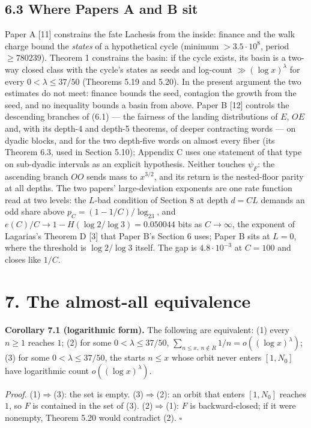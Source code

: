 \documentclass[11pt,a4paper]{article}
\begin{document}
\subsection{6.3 Where Papers A and B
sit}\label{where-papers-a-and-b-sit}

Paper A {[}11{]} constrains the fate Lachesis from the inside: finance
and the walk charge bound the \emph{states} of a hypothetical cycle
(minimum \(>3.5\cdot 10^8\), period \(\ge 780239\)). Theorem 1
constrains the basin: if the cycle exists, its basin is a two-way closed
class with the cycle's states as seeds and log-count
\(\gg(\log x)^\lambda\) for every \(0<\lambda\le37/50\) (Theorems 5.19
and 5.20). In the present argument the two estimates do not meet:
finance bounds the seed, contagion the growth from the seed, and no
inequality bounds a basin from above. Paper B {[}12{]} controls the
descending branches of (6.1) --- the fairness of the landing
distributions of \(E\), \(OE\) and, with its depth-4 and depth-5
theorems, of deeper contracting words --- on dyadic blocks, and for the
two depth-five words on almost every fiber (its Theorem 6.3, used in
Section 5.10); Appendix C uses one statement of that type on sub-dyadic
intervals as an explicit hypothesis. Neither touches \(\psi_F\): the
ascending branch \(OO\) sends mass to \(x^{3/2}\), and its return is the
nested-floor parity at all depths. The two papers' large-deviation
exponents are one rate function read at two levels: the \(L\)-bad
condition of Section 8 at depth \(d=CL\) demands an odd share above
\(p_C=(1-1/C)/\log_23\), and \(e(C)/C\to1-H(\log2/\log3)=0.050044\) bits
as \(C\to\infty\), the exponent of Lagarias's Theorem D {[}3{]} that
Paper B's Section 6 uses; Paper B sits at \(L=0\), where the threshold
is \(\log2/\log3\) itself. The gap is \(4.8\cdot10^{-3}\) at \(C=100\)
and closes like \(1/C\).

\section{7. The almost-all
equivalence}\label{the-almost-all-equivalence}

\textbf{Corollary 7.1 (logarithmic form).} The following are equivalent:
(1) every \(n\ge 1\) reaches \(1\); (2) for some \(0<\lambda\le37/50\),
\(\sum_{n\le x,\ n\notin R}1/n=o((\log x)^{\lambda})\); (3) for some
\(0<\lambda\le37/50\), the starts \(n\le x\) whose orbit never enters
\([1,N_0]\) have logarithmic count \(o((\log x)^{\lambda})\).

\emph{Proof.} (1)\(\Rightarrow\)(3): the set is empty.
(3)\(\Rightarrow\)(2): an orbit that enters \([1,N_0]\) reaches \(1\),
so \(F\) is contained in the set of (3). (2)\(\Rightarrow\)(1): \(F\) is
backward-closed; if it were nonempty, Theorem 5.20 would contradict (2).
\(\square\)
\end{document}
